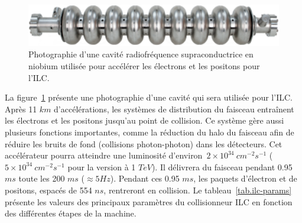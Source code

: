 \begin{figure}[!h]
  \begin{center}
    \includegraphics[width=1.0\textwidth]{ILC/figs/rf-cav.png}
    \caption{Photographie d'une cavité radiofréquence supraconductrice en niobium utilisée pour accélérer les électrons et les positons pour l'ILC.}
    \label{fig:rf-cav}
  \end{center}
\end{figure}
La figure~\ref{fig:rf-cav} présente une photographie d'une cavité qui sera utilisée pour l'ILC. Après 11 $km$ d'accélérations, les systèmes de distribution du faisceau entraînent les électrons et les positons jusqu'au point de collision. Ce système gère aussi plusieurs fonctions importantes, comme la réduction du halo du faisceau afin de réduire les bruits de fond (collisions photon-photon) dans les détecteurs. Cet accélérateur pourra atteindre une luminosité d'environ~$2\times10^{34}~cm^{-2}s^{-1}$ ($5\times10^{34}~cm^{-2}s^{-1}$ pour la version à 1 $TeV$). Il délivrera du faisceau pendant 0.95 $ms$ toute les 200 $ms$ ($\approx 5 Hz$). Pendant ces 0.95 $ms$, les paquets d'électron et de positons, espacés de 554 $ns$, rentreront en collision. Le tableau~\ref{tab.ilc-params} présente les valeurs des principaux paramètres du collisionneur ILC en fonction des différentes étapes de la machine. 
